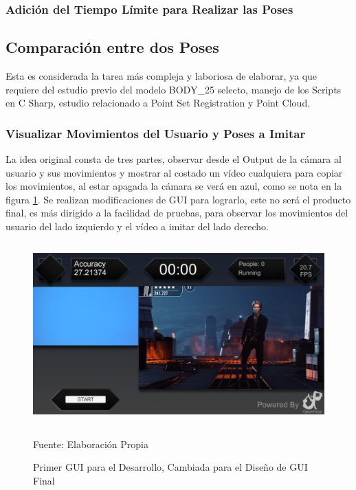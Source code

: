 \subsubsection{Adición del Tiempo Límite para Realizar las Poses}



\subsection{Comparación entre dos Poses}

Esta es considerada la tarea más compleja y laboriosa de elaborar, ya que requiere del estudio previo del modelo BODY\_25 selecto, manejo de los Scripts en C Sharp, estudio relacionado a Point Set Registration y Point Cloud. 


\subsubsection{Visualizar Movimientos del Usuario y Poses a Imitar}

La idea original consta de tres partes, observar desde el Output de la cámara al usuario y sus movimientos y mostrar al costado un vídeo cualquiera para copiar los movimientos, al estar apagada la cámara se verá en azul, como se nota en la figura \ref{primerintento}.  Se realizan modificaciones de GUI para lograrlo, este no será el producto final, es más dirigido a la facilidad de pruebas, para observar los movimientos del usuario del lado izquierdo y el vídeo a imitar del lado derecho.

\begin{figure}[t!]
	\centering
	\includegraphics[width=12cm,height=7cm,]{./Images/primerintento.png}
	\caption{Primer GUI para el Desarrollo, Cambiada para el Diseño de GUI Final}
	\footnotesize Fuente: Elaboración Propia
	\label{primerintento}
\end{figure}

